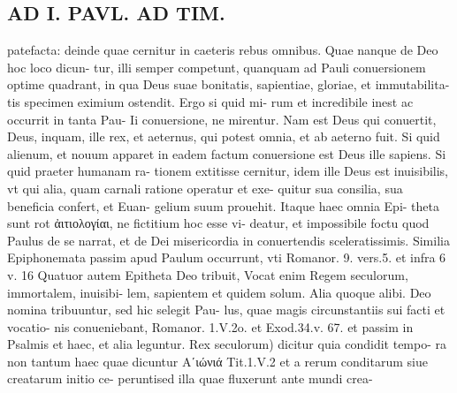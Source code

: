 \documentclass{article}
\begin{document}
\begin{pages}
\section*{AD I. PAVL. AD TIM. }
\marginpar{[ p.30 ]}\pstart patefacta: deinde quae cernitur in caeteris rebus omnibus. Quae nanque de Deo hoc loco dicun- tur, illi semper competunt, quanquam ad Pauli conuersionem optime quadrant, in qua Deus suae bonitatis, sapientiae, gloriae, et immutabilita- tis specimen eximium ostendit. Ergo si quid mi- rum et incredibile inest ac occurrit in tanta Pau- Ii conuersione, ne mirentur. Nam est Deus qui conuertit, Deus, inquam, ille rex, et aeternus, qui potest omnia, et ab aeterno fuit. Si quid alienum, et nouum apparet in eadem factum conuersione est Deus ille sapiens. Si quid praeter humanam ra- tionem extitisse cernitur, idem ille Deus est inuisibilis, vt qui alia, quam carnali ratione operatur et exe- quitur sua consilia, sua beneficia confert, et Euan- gelium suum prouehit. Itaque haec omnia Epi- theta sunt rot ἀιτιολογίαι, ne fictitium hoc esse vi- deatur, et impossibile foctu quod Paulus de se narrat, et de Dei misericordia in conuertendis sceleratissimis. Similia Epiphonemata passim apud Paulum occurrunt, vti Romanor. 9. vers.5. et infra 6 v. 16 Quatuor autem Epitheta Deo tribuit, Vocat enim Regem seculorum, immortalem, inuisibi- lem, sapientem et quidem solum. Alia quoque alibi. Deo nomina tribuuntur, sed hic selegit Pau- lus, quae magis circunstantiis sui facti et vocatio- nis conueniebant, Romanor. 1.V.2o. et Exod.34.v. 67. et passim in Psalmis et haec, et alia leguntur. Rex seculorum) dicitur quia condidit tempo- ra non tantum haec quae dicuntur Αʹιώνιά  Tit.1.V.2 et a rerum conditarum siue creatarum initio ce- peruntised illa quae fluxerunt ante mundi crea-  \pend

\end{pages}
\end{document}
